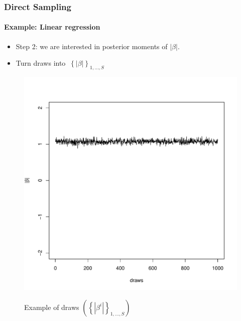 \documentclass[
  shownotes,
  xcolor={svgnames},
  hyperref={colorlinks,citecolor=DarkBlue,linkcolor=DarkRed,urlcolor=DarkBlue}
  , aspectratio=169]{beamer}
\begin{document}
\begin{frame}[fragile]
\frametitle{Direct Sampling}
\framesubtitle{Example: Linear regression}
\begin{itemize}

\item Step 2: we are interested in posterior moments of $|\beta|$. 
\item Turn draws into $\ \left\{ \left| \beta \right| \right\}_{1,\ldots,S}$
\end{itemize}

\begin{figure}[H] \centering
  \centering
  \caption{Example of draws $\left( \left\{ |\beta^{i}| \right\}_{1,\ldots,S} \right)$}
  \includegraphics[scale=0.25]{figures/abs}
  \\
  \tiny 
\end{figure}




\end{frame}
\end{document}
